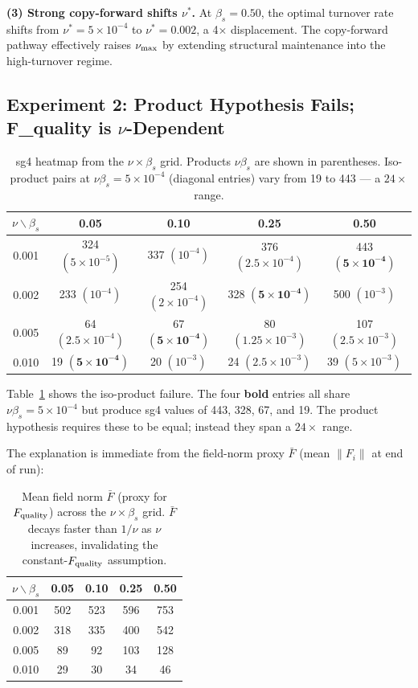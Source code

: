 \documentclass[11pt]{article}
\begin{document}
\textbf{(3) Strong copy-forward shifts $\nu^*$.} At $\beta_s=0.50$, the
optimal turnover rate shifts from $\nu^*=5\times10^{-4}$ to $\nu^*=0.002$,
a 4$\times$ displacement. The copy-forward pathway effectively raises
$\nu_{\rm max}$ by extending structural maintenance into the high-turnover
regime.

\subsection{Experiment 2: Product Hypothesis Fails; F\_quality is $\nu$-Dependent}

\begin{table}[h]
\centering
\caption{sg4 heatmap from the $\nu \times \beta_s$ grid. Products $\nu\beta_s$
are shown in parentheses. Iso-product pairs at $\nu\beta_s=5\times10^{-4}$
(diagonal entries) vary from 19 to 443 --- a $24\times$ range.}
\label{tab:exp2_sg4}
\small
\begin{tabular}{c|cccc}
\toprule
$\nu \backslash \beta_s$ & 0.05 & 0.10 & 0.25 & 0.50 \\
\midrule
0.001 & 324 $(5{\times}10^{-5})$
      & 337 $(10^{-4})$
      & 376 $(2.5{\times}10^{-4})$
      & 443 $(\mathbf{5{\times}10^{-4}})$ \\
0.002 & 233 $(10^{-4})$
      & 254 $(2{\times}10^{-4})$
      & 328 $(\mathbf{5{\times}10^{-4}})$
      & 500 $(10^{-3})$ \\
0.005 &  64 $(2.5{\times}10^{-4})$
      &  67 $(\mathbf{5{\times}10^{-4}})$
      &  80 $(1.25{\times}10^{-3})$
      & 107 $(2.5{\times}10^{-3})$ \\
0.010 &  19 $(\mathbf{5{\times}10^{-4}})$
      &  20 $(10^{-3})$
      &  24 $(2.5{\times}10^{-3})$
      &  39 $(5{\times}10^{-3})$ \\
\bottomrule
\end{tabular}
\end{table}

Table~\ref{tab:exp2_sg4} shows the iso-product failure. The four
\textbf{bold} entries all share $\nu\beta_s = 5\times10^{-4}$ but produce
sg4 values of 443, 328, 67, and 19. The product hypothesis requires these
to be equal; instead they span a $24\times$ range.

The explanation is immediate from the field-norm proxy $\bar{F}$ (mean
$\|F_i\|$ at end of run):

\begin{table}[h]
\centering
\caption{Mean field norm $\bar{F}$ (proxy for $F_{\rm quality}$) across the
$\nu \times \beta_s$ grid. $\bar{F}$ decays faster than $1/\nu$ as $\nu$
increases, invalidating the constant-$F_{\rm quality}$ assumption.}
\label{tab:exp2_fnorm}
\small
\begin{tabular}{c|cccc}
\toprule
$\nu \backslash \beta_s$ & 0.05 & 0.10 & 0.25 & 0.50 \\
\midrule
0.001 & 502 & 523 & 596 & 753 \\
0.002 & 318 & 335 & 400 & 542 \\
0.005 &  89 &  92 & 103 & 128 \\
0.010 &  29 &  30 &  34 &  46 \\
\bottomrule
\end{tabular}
\end{table}
\end{document}
